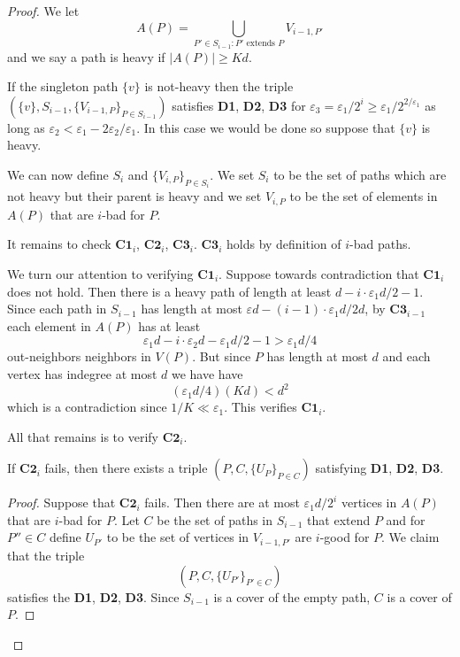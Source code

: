 \documentclass[10pt,a4paper]{amsart}
\newcommand{\vep}{\varepsilon}
\begin{document}
\begin{proof}
\medskip

We let
\[
A(P) = \bigcup_{P' \in S_{i - 1}: P' \text{ extends } P } V_{i - 1, P'}
\]
and we say a path is heavy if $|A(P)| \geq K d$.

\medskip

If the singleton path $\{v\}$ is not-heavy then the triple $(\{v\}, S_{i - 1}, \{V_{i - 1, P} \}_{P \in S_{i - 1}} )$ satisfies \textbf{D1}, \textbf{D2}, \textbf{D3} for $\vep_3 = \vep_1 /2^i \geq \vep_1 / 2^{2/\vep_1}$ as long as $\vep_2 < \vep_1 - 2 \vep_2/\vep_1 $. In this case we would be done so suppose that $\{v \}$ is heavy.

\medskip

We can now define $S_i$ and $\{V_{i, P} \}_{P \in S_i}$. We set $S_i$ to be the set of paths which are not heavy but their parent is heavy and we set $V_{i, P}$ to be the set of elements in $ A(P) $ that are $i$-bad for $P$.

\medskip

It remains to check $\textbf{C1}_i$, $\textbf{C2}_i$, $\textbf{C3}_i$. $\textbf{C3}_i$ holds by definition of $i$-bad paths.

\bigskip

We turn our attention to verifying $\textbf{C1}_i$. Suppose towards contradiction that $\textbf{C1}_i$ does not hold. Then there is a heavy path of length at least $d - i \cdot \vep_1 d /2 - 1$. Since each path in $S_{i - 1}$ has length at most $\vep d - (i - 1) \cdot \vep_1 d /2 d$, by $\textbf{C3}_{i - 1}$ each element in $A(P)$ has at least
\[
\vep_1 d - i \cdot \vep_2 d - \vep_1 d/2 - 1 > \vep_1 d/ 4
\]
out-neighbors neighbors in $V(P)$. But since $P$ has length at most $d$ and each vertex has indegree at most $d$ we have have
\[
(\vep_1 d/4) (K d) < d^2
\]
which is a contradiction since $1/K \ll \vep_1$. This verifies $\textbf{C1}_i$.

\bigskip

All that remains is to verify $\textbf{C2}_i$.
\begin{claim} If $\textbf{C2}_i$ fails, then there exists a triple $(P, C, \{U_{P}\}_{P \in C})$ satisfying \textbf{D1}, \textbf{D2}, \textbf{D3}.
\end{claim}
\begin{proof} Suppose that $\textbf{C2}_i$ fails. Then there are at most $\vep_1 d / 2^i$ vertices in $A(P)$ that are $i$-bad for $P$. Let $C$ be the set of paths in $S_{i - 1}$ that extend $P$ and for $P'' \in C$ define $U_{P'}$ to be the set of vertices in $V_{i - 1, P'}$ are $i$-good for $P$.
We claim that the triple
\[
(P, C, \{U_{P'} \}_{P' \in C} )
\]
satisfies the \textbf{D1}, \textbf{D2}, \textbf{D3}. Since $S_{i - 1}$ is a cover of the empty path, $C$ is a cover of $P$.


\end{proof}
\end{proof}
\end{document}
